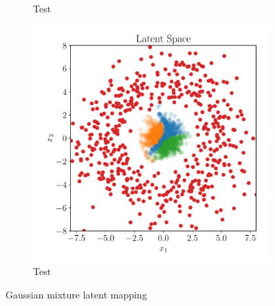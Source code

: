 \begin{figure}[htpb]
\begin{subfigure}[]{0.4\textwidth}
        \caption{Test}
        \label{fig:gmm_sample_space_gumbel}
    \end{subfigure}
    \begin{subfigure}[]{0.4\textwidth}
        \centering
    \includegraphics[width=\linewidth]{figures/toy_example/gaussian_mixture/latent_space_with_outliers.pdf}
        \caption{Test}
        \label{fig:gmm_latent_space_gumbel}
    \end{subfigure}
    \caption{Gaussian mixture latent mapping}%
    \label{fig:latent_gmm}
\end{figure}

